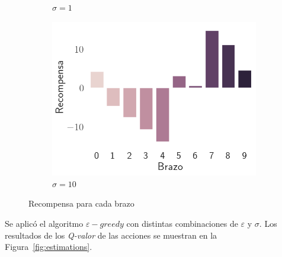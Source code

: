 \documentclass[12pt]{article}
\begin{document}
\begin{figure}[H]
\begin{subfigure}[H]{0.3\textwidth}
            \caption{$\sigma=1$}
            \label{fig:rewards_1}
        \end{subfigure}
        \begin{subfigure}[H]{0.3\textwidth}
            \includegraphics[width=\textwidth]{../img/rewards_sigma_10}
            \caption{$\sigma=10$}
            \label{fig:rewards_10}
        \end{subfigure}
        \caption{Recompensa para cada brazo}
        \label{fig:rewards}
    \end{figure}

    Se aplicó el algoritmo $\varepsilon-greedy$ con distintas combinaciones de $\varepsilon$ y $\sigma$.
    Los resultados de los \textit{Q-valor} de las acciones se muestran en la Figura~\ref{fig:estimations}.
\end{document}
